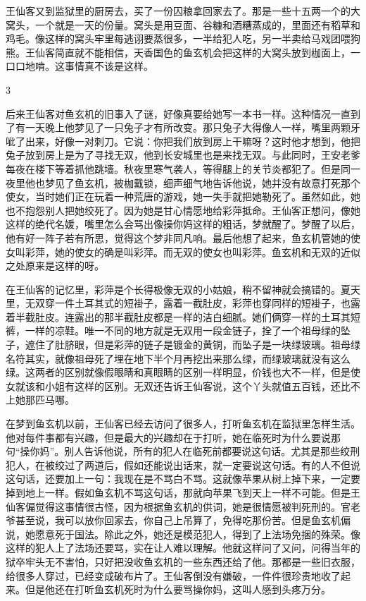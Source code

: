 王仙客又到监狱里的厨房去，买了一份囚粮拿回家去了。那是一些十五两一个的大窝头，一个就是一天的份量。窝头是用豆面、谷糠和酒糟蒸成的，里面还有稻草和鸡毛。像这样的窝头牢里每逃诩要蒸很多，一半给犯人吃，另一半卖给马戏团喂狗熊。王仙客简直就不能相信，天香国色的鱼玄机会把这样的大窝头放到枷面上，一口口地啃。这事情真不该是这样。 

3 

后来王仙客对鱼玄机的旧事入了谜，好像真要给她写一本书一样。这种情况一直到了有一天晚上他梦见了一只兔子才有所改变。那只兔子大得像人一样，嘴里两颗牙呲了出来，好像一对刺刀。它说：你把我们放到房上干嘛呀？这时他才想到，他把兔子放到房上是为了寻找无双，他到长安城里也是来找无双。与此同时，王安老爹每夜在楼下等着抓他跳墙。秋夜里寒气袭人，等得腿上的关节炎都犯了。但是同一夜里他也梦见了鱼玄机，披枷戴锁，细声细气地告诉他说，她并没有故意打死那个使女，当时她们正在玩着一种荒唐的游戏，她一失手就把她勒死了。虽然如此，她也不抱怨别人把她绞死了。因为她是甘心情愿地给彩萍抵命。王仙客正想问，像她这样的绝代名媛，嘴里怎么会骂出像操你妈这样的粗话，梦就醒了。梦醒了以后，他有好一阵子若有所思，觉得这个梦非同凡响。最后他想了起来，鱼玄机管她的使女叫彩萍，她的使女的确是叫彩萍。而无双的使女也叫彩萍。鱼玄机和无双的近似之处原来是这样的呀。 

在王仙客的记忆里，彩萍是个长得极像无双的小姑娘，稍不留神就会搞错的。夏天里，无双穿一件土耳其式的短褂子，露着一截肚皮，彩萍也穿同样的短褂子，也露着半截肚皮。连露出的那半截肚皮都是一样的洁白细腻。她们俩穿一样的土耳其短裤，一样的凉鞋。唯一不同的地方就是无双用一段金链子，拴了一个祖母绿的坠子，遮住了肚脐眼，但是彩萍的链子是镀金的黄铜，而坠子是一块绿玻璃。祖母绿名符其实，就像祖母死了埋在地下半个月再挖出来那么绿，而绿玻璃就没有这么绿。这两者的区别就像假眼睛和真眼睛的区别一样明显，价钱也大不一样，但是使女就该和小姐有这样的区别。无双还告诉王仙客说，这个丫头就值五百钱，还比不上她那匹马哪。 

在梦到鱼玄机以前，王仙客已经去访问了很多人，打听鱼玄机在监狱里怎样生活。他对每件事都有兴趣，但是最大的兴趣却在于打听，她在临死时为什么要说那句“操你妈”。别人告诉他说，所有的犯人在临死前都要说这句话。尤其是那些绞刑犯人，在被绞过了两道后，假如还能说出话来，就一定要说这句话。有的人不但说这句话，还要加上一句：我现在是不骂白不骂。这就像苹果从树上掉下来，一定要掉到地上一样。假如鱼玄机不骂这句话，那就向苹果飞到天上一样不可能。但是王仙客偏觉得这事情很古怪，因为根据鱼玄机的供词，她是很情愿被判死刑的。官老爷甚至说，我可以放你回家去，你自己上吊算了，免得吃那份苦。但是鱼玄机偏说，她愿意死于国法。除此之外，她还是模范犯人，得到了上法场免捆的殊荣。像这样的犯人上了法场还要骂，实在让人难以理解。他就这样问了又问，问得当年的狱卒牢头无不害怕，只好把没收鱼玄机的一些东西还给了他。那都是一些旧衣服，给很多人穿过，已经变成破布片了。王仙客倒没有嫌破，一件件很珍贵地收了起来。但是他还在打听鱼玄机死时为什么要骂操你妈，这叫人感到头疼万分。 


